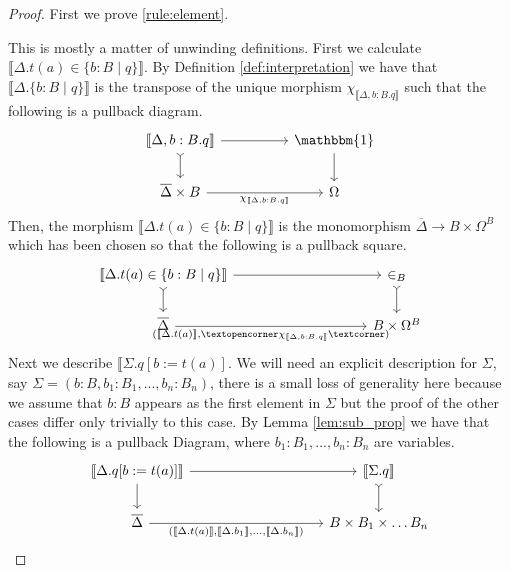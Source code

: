 \documentclass{birkjour}
\theoremstyle{plain}
\theoremstyle{definition}
\newcommand{\adj}[1]{\text{\textopencorner}{#1}\text{\textcorner}}
\newcommand{\lto}{\longrightarrow}
\begin{document}
	\begin{proof}
		First we prove \eqref{rule:element}.
		
		This is mostly a matter of unwinding definitions. First we calculate $\llbracket \Delta. t(a) \in \lbrace b:B \mid q\rbrace\rrbracket$. By Definition \ref{def:interpretation} we have that $\llbracket \Delta. \lbrace b:B \mid q\rbrace\rrbracket$ is the transpose of the unique morphism $\chi_{\llbracket \Delta,b:B. q\rrbracket}$ such that the following is a pullback diagram.
		\begin{equation}
			\begin{tikzcd}[column sep = huge]
				\llbracket \Delta,b:B. q\rrbracket\arrow[r]\arrow[d,rightarrowtail] & \mathbbm{1}\arrow[d]\\
				\overline{\Delta} \times B\arrow[r,swap,"{\chi_{\llbracket \Delta, b:B. q\rrbracket}}"] & \Omega
			\end{tikzcd}
		\end{equation}
		Then, the morphism $\llbracket \Delta. t(a) \in \lbrace b:B \mid q\rbrace \rrbracket$ is the monomorphism $\overline{\Delta} \lto B \times \Omega^B$ which has been chosen so that the following is a pullback square.
		\begin{equation}
			\begin{tikzcd}[column sep = huge]
				\llbracket \Delta. t(a) \in \lbrace b:B \mid q \rbrace\rrbracket\arrow[rr]\arrow[d,rightarrowtail] & & \in_B\arrow[d,rightarrowtail]\\
				\overline{\Delta}\arrow[rr,swap,"{(\llbracket \Delta. t(a)\rrbracket, \adj{\chi_{\llbracket \Delta,b:B. q\rrbracket}})}"] & & B \times \Omega^B
			\end{tikzcd}
		\end{equation}
		Next we describe $\llbracket \Sigma. q[b:= t(a)]$. We will need an explicit description for $\Sigma$, say $\Sigma = (b:B, b_1:B_1,...,b_n:B_n)$, there is a small loss of generality here because we assume that $b:B$ appears as the first element in $\Sigma$ but the proof of the other cases differ only trivially to this case. By Lemma \ref{lem:sub_prop} we have that the following is a pullback Diagram, where $b_1:B_1,...,b_n:B_n$ are variables.
		\begin{equation}
			\begin{tikzcd}[column sep = huge]
				\llbracket \Delta. q[b:=t(a)]\rrbracket\arrow[rr]\arrow[d] && \llbracket\Sigma. q \rrbracket \arrow[d,rightarrowtail]\\
				\overline{\Delta}\arrow[rr,swap,"{(\llbracket \Delta. t(a)\rrbracket,\llbracket \Delta. b_1\rrbracket,\hdots, \llbracket \Delta. b_n\rrbracket)}"] && B \times B_1 \times \hdots B_n

\end{tikzcd}
\end{equation}
\end{proof}
\end{document}
